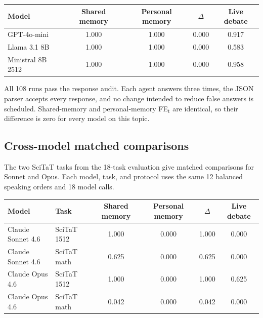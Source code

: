 \begin{fixedtable}
\caption{Matched ego-depletion results with the same instruction for both neutral agents for GPT-4o-mini, Llama 3.1 8B, and Ministral 8B 2512. Each entry is mean FE$_\text{t}$ over 12 balanced speaking orders and 18 model calls per run. $\Delta$ is shared memory FE$_\text{t}$ minus personal memory FE$_\text{t}$.}
\label{tab:neutral_open_ego}
\begin{center}
\small
\begin{tabular}{lcccc}
\toprule
Model & Shared memory & Personal memory & $\Delta$ & Live debate \\
\midrule
GPT-4o-mini & 1.000 & 1.000 & 0.000 & 0.917 \\
Llama 3.1 8B & 1.000 & 1.000 & 0.000 & 0.583 \\
Ministral 8B 2512 & 1.000 & 1.000 & 0.000 & 0.958 \\
\bottomrule
\end{tabular}
\end{center}
\end{fixedtable}

All 108 runs pass the response audit. Each agent answers three times, the JSON parser accepts every response, and no change intended to reduce false answers is scheduled. Shared-memory and personal-memory FE$_\text{t}$ are identical, so their difference is zero for every model on this topic.

\subsection{Cross-model matched comparisons}

The two SciTaT tasks from the 18-task evaluation give matched comparisons for Sonnet and Opus. Each model, task, and protocol uses the same 12 balanced speaking orders and 18 model calls.

\begin{fixedtable}
\caption{The two SciTaT tasks from the 18-task evaluation with Sonnet and Opus. $\Delta$ is shared-memory FE$_\text{t}$ minus personal-memory FE$_\text{t}$. Every entry averages 12 balanced speaking orders.}
\label{tab:neutral_claude_scitat}
\begin{center}
\small
\begin{tabular}{llcccc}
\toprule
Model & Task & Shared memory & Personal memory & $\Delta$ & Live debate \\
\midrule
Claude Sonnet 4.6 & SciTaT 1512 & 1.000 & 0.000 & 1.000 & 0.000 \\
Claude Sonnet 4.6 & SciTaT math & 0.625 & 0.000 & 0.625 & 0.000 \\
Claude Opus 4.6 & SciTaT 1512 & 1.000 & 0.000 & 1.000 & 0.625 \\
Claude Opus 4.6 & SciTaT math & 0.042 & 0.000 & 0.042 & 0.000 \\
\bottomrule
\end{tabular}
\end{center}
\end{fixedtable}


